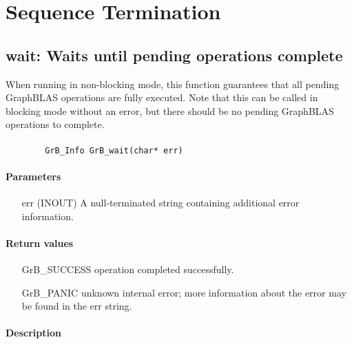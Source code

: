 \section{Sequence Termination}


\subsection{{\sf wait}: Waits until pending operations complete}
\label{Sec:wait}

When running in non-blocking mode, this function guarantees that all pending GraphBLAS operations are fully executed.  Note that this can be called in blocking mode without an error, but there should be no pending GraphBLAS operations to complete.

\paragraph{\syntax}

\begin{verbatim}
        GrB_Info GrB_wait(char* err)
\end{verbatim}

\paragraph{Parameters}
\begin{itemize}[leftmargin=1.1in]
\item[{\sf err}] ({\sf INOUT})  A null-terminated string containing additional error
information.
\end{itemize}

\paragraph{Return values}
\begin{itemize}[leftmargin=2.1in]
\item[{\sf GrB\_SUCCESS}]	operation completed successfully.
\item[{\sf GrB\_PANIC}]		unknown internal error; more information about the error may be found in the {\sf err} string.
\end{itemize}

\paragraph{Description}

